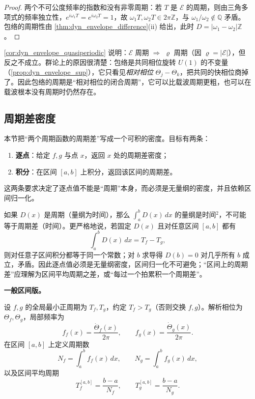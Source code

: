 \begin{proof}
两个不可公度频率的指数和没有非零周期：若 $T$ 是 $\mathcal E$ 的周期，则由三角多项式的频率独立性，$e^{i\omega_1T}=e^{i\omega_2T}=1$，故 $\omega_1T,\omega_2T\in2\pi\mathbb Z$，与 $\omega_1/\omega_2\notin\mathbb Q$ 矛盾。包络的周期性由 \cref{thm:dyn_envelope_difference}(ii) 给出，此时 $D=|\omega_1-\omega_2|\mathbb Z$。
\end{proof}

\begin{remark}[包络的周期性严格弱于载波的周期性]\label{rem:dyn_envelope_weaker}
\cref{cor:dyn_envelope_quasiperiodic} 说明：$\mathcal E$ 周期 $\Rightarrow$ $\varrho$ 周期（因 $\varrho=|\mathcal E|$），但反之不成立。群论上的原因很清楚：包络是共同相位旋转 $U(1)$ 的不变量（\cref{prop:dyn_envelope_sup}），它只看见\emph{相对相位} $\Theta_j-\Theta_k$，把共同的快相位商掉了。因此包络的周期是“相对相位的闭合周期”，它可以比载波周期更粗，也可以在载波根本没有周期时仍然存在。
\end{remark}

\subsection{周期差密度}
\label{subsec:dyn_period_difference_density}

本节把“两个周期函数的周期差”写成一个可积的密度。目标有两条：
\begin{enumerate}[label=(\roman*)]
    \item \textbf{逐点}：给定 \(f,g\) 与点 \(x\)，返回 \(x\) 处的周期差密度；
    \item \textbf{积分}：在区间 \([a,b]\) 上积分，返回该区间的周期差。
\end{enumerate}
这两条要求决定了逐点值不能是“周期”本身，而必须是无量纲的密度，并且依赖区间归一化。

\begin{remark}[为什么逐点值不能是周期]
\label{rem:dyn_period_density_no_go}
如果 \(D(x)\) 是周期（量纲为时间），那么 \(\int_a^b D(x)\,dx\) 的量纲是时间\(^2\)，不可能等于周期差（时间）。更严格地说，若固定 \(D(x)\) 且对任意区间 \([a,b]\) 都有
\[
\int_a^b D(x)\,dx=T_f-T_g,
\]
则对任意子区间积分都等于同一个常数；对 \(b\) 求导得 \(D(b)=0\) 对几乎所有 \(b\) 成立，矛盾。因此逐点值必须是无量纲密度，区间归一化不可避免；“区间上的周期差”应理解为区间平均周期之差，或“每过一个拍累积一个周期差”。
\end{remark}

\textbf{一般区间版。}

设 \(f,g\) 的全局最小正周期为 \(T_f,T_g\)，约定 \(T_f>T_g\)（否则交换 \(f,g\)）。解析相位为 \(\Theta_f,\Theta_g\)，局部频率为
\[
f_f(x)=\frac{\dot\Theta_f(x)}{2\pi},\qquad
f_g(x)=\frac{\dot\Theta_g(x)}{2\pi}.
\]
在区间 \([a,b]\) 上定义周期数
\[
N_f=\int_a^b f_f(x)\,dx,\qquad
N_g=\int_a^b f_g(x)\,dx,
\]
以及区间平均周期
\[
T_f^{[a,b]}=\frac{b-a}{N_f},\qquad
T_g^{[a,b]}=\frac{b-a}{N_g}.
\]

